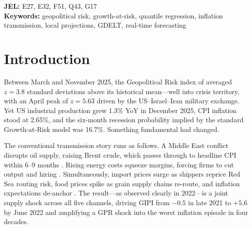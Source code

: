 \documentclass[12pt]{article}
\begin{document}
\begin{titlepage}
\begin{center}
\begin{abstract}
\medskip
\noindent\textbf{Real-time monitoring.}
A Layer~0 pipeline combining GDELT~2.0 news surveillance, LLM CAMEO
event coding, and an AIS tanker equity proxy provides sub-monthly
signal updates between GPR releases.
Current CAMEO codes 15/191 (military posture, no kinetic attack) and an
inactive AIS trigger confirm the decoupling persists as of March~2026.
\end{abstract}

\vspace{0.5cm}
\noindent\textbf{JEL:} E27, E32, F51, Q43, G17\\[4pt]
\noindent\textbf{Keywords:} geopolitical risk, growth-at-risk, quantile regression,
inflation transmission, local projections, GDELT, real-time forecasting
\end{center}\end{titlepage}

\newpage\setcounter{page}{1}

\section{Introduction}

Between March and November 2025, the Geopolitical Risk index of
\citet{caldara2022} averaged $z = 3.8$ standard deviations above its
historical mean---well into crisis territory, with an April peak of
$z = 5.63$ driven by the US--Israel--Iran military exchange.
Yet US industrial production grew 1.3\% YoY in December 2025,
CPI inflation stood at 2.65\%, and the six-month recession probability
implied by the standard Growth-at-Risk model was 16.7\%.
Something fundamental had changed.

The conventional transmission story runs as follows.
A Middle East conflict disrupts oil supply, raising Brent crude, which
passes through to headline CPI within 6--9 months \citep{conflitti2019}.
Rising energy costs squeeze margins, forcing firms to cut output and
hiring \citep{bloom2009}.
Simultaneously, import prices surge as shippers reprice Red Sea routing
risk, food prices spike as grain supply chains re-route, and inflation
expectations de-anchor \citep{caldara2025}.
The result---as observed clearly in 2022---is a joint supply shock across
all five channels, driving GIPI from $-0.5$ in late 2021 to $+5.6$ by
June 2022 and amplifying a GPR shock into the worst inflation episode in
four decades.
\end{document}

